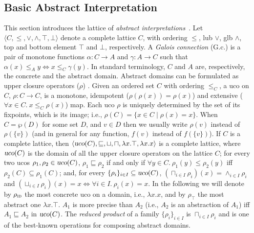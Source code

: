\documentclass[prodmode,acmtocl]{acmsmall}
\def\uco{\ensuremath{\rho}\xspace}
\def\ucos{\ensuremath{\mbox{\sl uco}}\xspace}
\newcommand{\0}{\mbox{\bf 0}}
\def\IDDOM{\ensuremath{\uco_{\textsc{id}}}\xspace}
\def\TOPDOM{\ensuremath{\uco_{\top}}\xspace}
\begin{document}
\subsection{Basic Abstract Interpretation}
\label{sec:basicAbstractInterpretation}

This section introduces the lattice of \emph{abstract
  interpretations}~\cite{CC77}.  Let $\langle C, \leq, \vee, \wedge,
\top, \bot \rangle$ denote a complete lattice $C$, with ordering
$\leq$, lub $\vee$, glb $\wedge$, top and bottom element $\top$ and
$\bot$, respectively.  A \emph{Galois connection} (G.c.) is a pair of
monotone functions $\alpha:C \rightarrow A$ and $\gamma:A \rightarrow
C$ such that $\alpha(x)\leq_{A} y \Leftrightarrow x \leq_{C}
\gamma(y)$.  In standard terminology, $C$ and $A$ are, respectively,
the concrete and the abstract domain.  Abstract domains can be
formulated as upper closure operators ($\uco$) \cite{CC77}.  Given an
ordered set $C$ with ordering $\leq_C$, a uco on $C$, $\uco: C
\rightarrow C$, is a monotone, idempotent ($\uco(\uco(x))=\uco(x)$)
and extensive ($\forall x \in C.~x \leq_C \uco(x)$) map.  Each uco
$\uco$ is uniquely determined by the set of its fixpoints, which is
its image; i.e., $\uco(C) = \{x \in C \mid \uco(x) = x\}$.  When
$C=\wp(D)$ for some set $D$, and $v\in D$ then we usually write
$\uco(v)$ instead of $\uco(\{v\})$ (and in general for any function,
$f(v)$ instead of $f(\{v\})$).  If $C$ is a complete lattice, then
$\langle \ucos(C), \sqsubseteq, \sqcup, \sqcap, \lambda x . \top,
\lambda x . x\rangle$ is a complete lattice, where $\ucos(C)$ is the
domain of all the upper closure operators on the lattice $C$; for
every two ucos $\uco_1, \uco_2 \in \ucos(C)$, $\uco_1 \sqsubseteq
\uco_2$ if and only if $\forall y \in C.~\uco_1(y) \leq \uco_2(y)$ iff
$\uco_2(C) \subseteq \uco_1(C)$; and, for every $\{\uco_i\}_{i\in I}
\subseteq \ucos(C)$, $(\sqcap_{i \in I}\uco_i)(x) = \wedge_{i \in
  I}\uco_i$ and $(\sqcup_{i \in I}\uco_i)(x) = x \Leftrightarrow
\forall i \in I.~\uco_i(x) = x$.  In the following we will denote by
$\IDDOM$ the most concrete uco on a domain, i.e., $\lambda x.x$, and
by $\TOPDOM$ the most abstract one $\lambda x.\top$. $A_1$ is more
precise than $A_2$ (i.e., $A_2$ is an abstraction of $A_1$) iff $A_1
\sqsubseteq A_2$ in $\ucos(C)$.  The \emph{reduced product} of a
family $\{\uco_i\}_{i\in I}$ is $\sqcap_{i\in I}\uco_i$ and is one of
the best-known operations for composing abstract domains.
\end{document}
